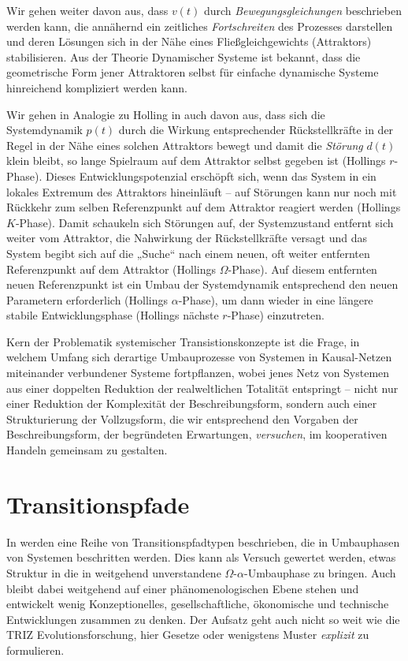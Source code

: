 \documentclass[12pt,a4paper]{article}
\begin{document}
Wir gehen weiter davon aus, dass $v(t)$ durch \emph{Bewegungsgleichungen}
beschrieben werden kann, die annähernd ein zeitliches \emph{Fortschreiten} des
Prozesses darstellen und deren Lösungen sich in der Nähe eines
Fließgleichgewichts (Attraktors) stabilisieren.  Aus der Theorie Dynamischer
Systeme ist bekannt, dass die geometrische Form jener Attraktoren selbst für
einfache dynamische Systeme hinreichend kompliziert werden kann.

Wir gehen in Analogie zu Holling in \cite{Holling2001} auch davon aus, dass
sich die Systemdynamik $p(t)$ durch die Wirkung entsprechender Rückstellkräfte
in der Regel in der Nähe eines solchen Attraktors bewegt und damit die
\emph{Störung} $d(t)$ klein bleibt, so lange Spielraum auf dem Attraktor
selbst gegeben ist (Hollings $r$-Phase). Dieses Entwicklungspotenzial
erschöpft sich, wenn das System in ein lokales Extremum des Attraktors
hineinläuft -- auf Störungen kann nur noch mit Rückkehr zum selben
Referenzpunkt auf dem Attraktor reagiert werden (Hollings $K$-Phase). Damit
schaukeln sich Störungen auf, der Systemzustand entfernt sich weiter vom
Attraktor, die Nahwirkung der Rückstellkräfte versagt und das System begibt
sich auf die „Suche“ nach einem neuen, oft weiter entfernten Referenzpunkt auf
dem Attraktor (Hollings $\Omega$-Phase). Auf diesem entfernten neuen
Referenzpunkt ist ein Umbau der Systemdynamik entsprechend den neuen
Parametern erforderlich (Hollings $\alpha$-Phase), um dann wieder in eine
längere stabile Entwicklungsphase (Hollings nächste $r$-Phase) einzutreten.


  Kern der Problematik systemischer Transistionskonzepte ist die Frage, in
welchem Umfang sich derartige Umbauprozesse von Systemen in Kausal-Netzen
miteinander verbundener Systeme fortpflanzen, wobei jenes Netz von Systemen
aus einer doppelten Reduktion der realweltlichen Totalität entspringt -- nicht
nur einer Reduktion der Komplexität der Beschreibungsform, sondern auch einer
Strukturierung der Vollzugsform, die wir entsprechend den Vorgaben der
Beschreibungsform, der begründeten Erwartungen, \emph{versuchen}, im
kooperativen Handeln gemeinsam zu gestalten.


\section{Transitionspfade}

In \cite{Geels2007} werden eine Reihe von Transitionspfadtypen beschrieben,
die in Umbauphasen von Systemen beschritten werden. Dies kann als Versuch
gewertet werden, etwas Struktur in die in \cite{Holling2001} weitgehend
unverstandene $\Omega$-$\alpha$-Umbauphase zu bringen. Auch \cite{Geels2007}
bleibt dabei weitgehend auf einer phänomenologischen Ebene stehen und
entwickelt wenig Konzeptionelles, gesellschaftliche, ökonomische und
technische Entwicklungen zusammen zu denken. Der Aufsatz geht auch nicht so
weit wie die TRIZ Evolutionsforschung, hier Gesetze oder wenigstens Muster
\emph{explizit} zu formulieren.
\end{document}
